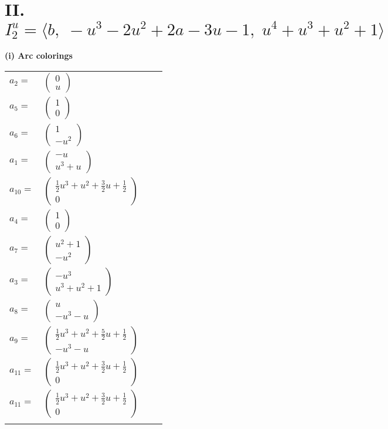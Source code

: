 \documentclass[1p]{elsarticle_modified}
\theoremstyle{definition}
\begin{document}
\centering \section*{II. $I^u_{2}= \langle b,\;- u^3-2 u^2+2 a-3 u-1,\;u^4+u^3+u^2+1 \rangle$}
\flushleft \textbf{(i) Arc colorings}\\
\begin{tabular}{m{7pt} m{180pt} m{7pt} m{180pt} }
\flushright $a_{2}=$&$\begin{pmatrix}0\\u\end{pmatrix}$ \\
\flushright $a_{5}=$&$\begin{pmatrix}1\\0\end{pmatrix}$ \\
\flushright $a_{6}=$&$\begin{pmatrix}1\\- u^2\end{pmatrix}$ \\
\flushright $a_{1}=$&$\begin{pmatrix}- u\\u^3+u\end{pmatrix}$ \\
\flushright $a_{10}=$&$\begin{pmatrix}\frac{1}{2} u^3+u^2+\frac{3}{2} u+\frac{1}{2}\\0\end{pmatrix}$ \\
\flushright $a_{4}=$&$\begin{pmatrix}1\\0\end{pmatrix}$ \\
\flushright $a_{7}=$&$\begin{pmatrix}u^2+1\\- u^2\end{pmatrix}$ \\
\flushright $a_{3}=$&$\begin{pmatrix}- u^3\\u^3+u^2+1\end{pmatrix}$ \\
\flushright $a_{8}=$&$\begin{pmatrix}u\\- u^3- u\end{pmatrix}$ \\
\flushright $a_{9}=$&$\begin{pmatrix}\frac{1}{2} u^3+u^2+\frac{5}{2} u+\frac{1}{2}\\- u^3- u\end{pmatrix}$ \\
\flushright $a_{11}=$&$\begin{pmatrix}\frac{1}{2} u^3+u^2+\frac{3}{2} u+\frac{1}{2}\\0\end{pmatrix}$\\ \flushright $a_{11}=$&$\begin{pmatrix}\frac{1}{2} u^3+u^2+\frac{3}{2} u+\frac{1}{2}\\0\end{pmatrix}$\\&\end{tabular}
\end{document}
